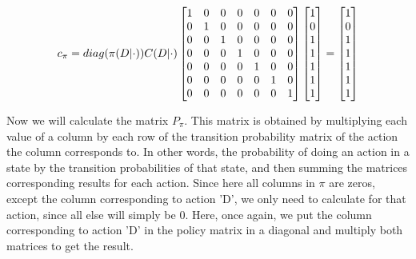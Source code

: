 \documentclass{article}
\begin{document}
\begin{equation}
    \notag
    c_{\pi} = diag(\pi(D|\cdot))C(D|\cdot)
    \begin{bmatrix}
        1 & 0 & 0 & 0 & 0 & 0 & 0 \\
        0 & 1 & 0 & 0 & 0 & 0 & 0 \\
        0 & 0 & 1 & 0 & 0 & 0 & 0 \\
        0 & 0 & 0 & 1 & 0 & 0 & 0 \\
        0 & 0 & 0 & 0 & 1 & 0 & 0 \\
        0 & 0 & 0 & 0 & 0 & 1 & 0 \\
        0 & 0 & 0 & 0 & 0 & 0 & 1 \\
    \end{bmatrix}
    \begin{bmatrix}
        1 \\
        0 \\
        1 \\
        1 \\
        1 \\
        1 \\
        1 \\
    \end{bmatrix}
    = 
    \begin{bmatrix}
        1 \\
        0 \\
        1 \\
        1 \\
        1 \\
        1 \\
        1 \\
    \end{bmatrix}
\end{equation}

\bigskip

Now we will calculate the matrix $P_{\pi}$.
This matrix is obtained by multiplying each value of a column by each row of the transition probability matrix of the action the column corresponds to.
In other words, the probability of doing an action in a state by the transition probabilities of that state, and then summing the matrices corresponding results for each action.
Since here all columns in $\pi$ are zeros, except the column corresponding to action 'D', we only need to calculate for that action, since all else will simply be 0.
Here, once again, we put the column corresponding to action 'D' in the policy matrix in a diagonal and multiply both matrices to get the result.
\end{document}
